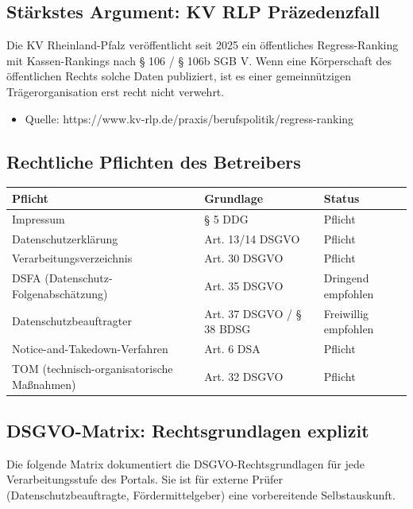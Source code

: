\documentclass{umbruch-position}
\begin{document}
\subsection{Stärkstes Argument: KV RLP Präzedenzfall}

Die KV Rheinland-Pfalz veröffentlicht seit 2025 ein öffentliches Regress-Ranking mit Kassen-Rankings nach § 106 / § 106b SGB V. Wenn eine Körperschaft des öffentlichen Rechts solche Daten publiziert, ist es einer gemeinnützigen Trägerorganisation erst recht nicht verwehrt.

\begin{itemize}[nosep]
  \item Quelle: https://www.kv-rlp.de/praxis/berufspolitik/regress-ranking
\end{itemize}

\subsection{Rechtliche Pflichten des Betreibers}

{\small
\begin{tabularx}{\textwidth}{X X X}
\toprule
\textbf{Pflicht} & \textbf{Grundlage} & \textbf{Status} \\
\midrule
Impressum & § 5 DDG & Pflicht \\
Datenschutzerklärung & Art. 13/14 DSGVO & Pflicht \\
Verarbeitungsverzeichnis & Art. 30 DSGVO & Pflicht \\
DSFA (Datenschutz-Folgenabschätzung) & Art. 35 DSGVO & Dringend empfohlen \\
Datenschutzbeauftragter & Art. 37 DSGVO / § 38 BDSG & Freiwillig empfohlen \\
Notice-and-Takedown-Verfahren & Art. 6 DSA & Pflicht \\
TOM (technisch-organisatorische Maßnahmen) & Art. 32 DSGVO & Pflicht \\
\bottomrule
\end{tabularx}
}


\subsection{DSGVO-Matrix: Rechtsgrundlagen explizit}

Die folgende Matrix dokumentiert die DSGVO-Rechtsgrundlagen für jede Verarbeitungsstufe des Portals. Sie ist für externe Prüfer (Datenschutzbeauftragte, Fördermittelgeber) eine vorbereitende Selbstauskunft.
\end{document}
